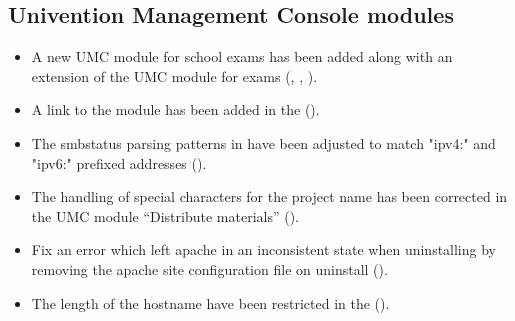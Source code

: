 \subsection{Univention Management Console modules}
\begin{itemize}
\item A new UMC module for school exams has been added along with an extension
  of the UMC  module for exams (,
  , ).
\item A link to the  module has been added in the  ().
\item The smbstatus parsing patterns in  have been adjusted to match "ipv4:" and "ipv6:" prefixed addresses ().
\item The handling of special characters for the project name has been corrected in the UMC module ``Distribute materials'' ().
\item Fix an error which left apache in an inconsistent state when uninstalling  by removing the  apache site configuration file on uninstall ().
\item The length of the hostname have been restricted in the  ().
\end{itemize}

